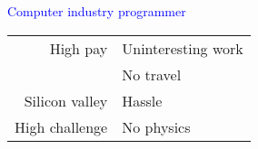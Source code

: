 \documentclass[12pt]{article}
\begin{document}
\Large\textcolor{blue}{\hfill Computer industry programmer \hfill}\vspace{-0.5in}\large
\begin{table}
\begin{center}
\begin{tabular}[c]{ r l }
High pay & Uninteresting work \\[1.0ex]
& No travel \\[1.0ex]
Silicon valley & Hassle \\[1.0ex]
High challenge & No physics \\[1.0ex]
\end{tabular}
\end{center}
\end{table}
\end{document}
